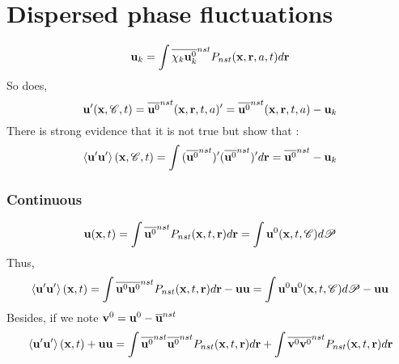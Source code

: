 \documentclass[12pt]{My_preprint}
\begin{document}
\section{Dispersed phase fluctuations}
\begin{equation}
    \textbf{u}_k
    = \int \overline{\chi_k \textbf{u}_k^0}^{nst} P_{nst}(\textbf{x},\textbf{r},a,t)d\textbf{r}
\end{equation}
So does, 
\begin{equation}
    \textbf{u}'(\textbf{x},\mathscr{C},t)
    =\overline{ \textbf{u}^0}^{nst}(\textbf{x},\textbf{r},t,a)' 
    = \overline{ \textbf{u}^0}^{nst}(\textbf{x},\textbf{r},t,a) - \textbf{u}_k
\end{equation}
There is strong evidence that it is not true but show that :
\begin{equation}
    \left<\textbf{u}'\textbf{u}'\right>(\textbf{x},\mathscr{C},t)
    =\int{ (\overline{ \textbf{u}^0}^{nst} )'(\overline{ \textbf{u}^0}^{nst})' }d\textbf{r}
    = \overline{ \textbf{u}^0}^{nst} - \textbf{u}_k
\end{equation}
\subsubsection*{Continuous}
\begin{equation*}
    \textbf{u}(\textbf{x},t)
    = \int \overline{ \textbf{u}^0}^{nst}  P_{nst}(\textbf{x},t,\textbf{r}) d\textbf{r}
    = \int  \textbf{u}^0(\textbf{x},t,\mathscr{C}) d\mathscr{P} 
\end{equation*}
Thus, 
\begin{equation*}
    \left<\textbf{u}'\textbf{u}'\right>(\textbf{x},t)
    = \int \overline{ \textbf{u}^0 \textbf{u}^0}^{nst}  
    P_{nst}(\textbf{x},t,\textbf{r}) d\textbf{r}
    - \textbf{uu}
    = \int  \textbf{u}^0\textbf{u}^0(\textbf{x},t,\mathscr{C}) d\mathscr{P} 
    - \textbf{uu}
\end{equation*}
Besides, if we note $\textbf{v}^0  =  \textbf{u}^0  - \overline{\textbf{u}}^{nst}$
\begin{equation*}
    \left<\textbf{u}'\textbf{u}'\right>(\textbf{x},t)
    + \textbf{uu}
    = \int 
    \overline{\textbf{u}^0}^{nst} \overline{\textbf{u}^0}^{nst} 
    P_{nst}(\textbf{x},t,\textbf{r}) d\textbf{r}
    +\int 
    \overline{ \textbf{v}^0\textbf{v}^0}^{nst}  
    P_{nst}(\textbf{x},t,\textbf{r}) d\textbf{r}
\end{equation*}
\end{document}
